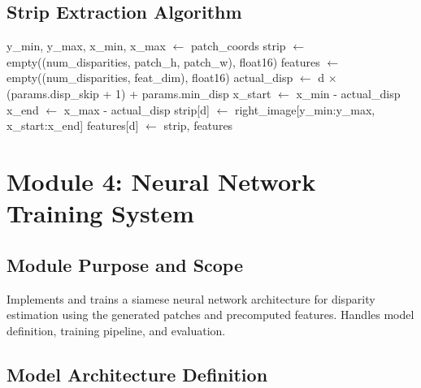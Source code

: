 \documentclass[12pt]{article}
\begin{document}
\subsection{Strip Extraction Algorithm}

\begin{algorithm}[H]
\caption{Right Image Strip Generation}
\begin{algorithmic}[1]
\State y\_min, y\_max, x\_min, x\_max $\gets$ patch\_coords
\State strip $\gets$ empty((num\_disparities, patch\_h, patch\_w), float16)
\State features $\gets$ empty((num\_disparities, feat\_dim), float16)
\State {}
    \State actual\_disp $\gets$ d $\times$ (params.disp\_skip + 1) + params.min\_disp
    \State x\_start $\gets$ x\_min - actual\_disp
    \State x\_end $\gets$ x\_max - actual\_disp
    \State strip[d] $\gets$ right\_image[y\_min:y\_max, x\_start:x\_end]
    \State features[d] $\gets$ 
\EndFor
\State \Return strip, features
\EndFunction
\end{algorithmic}
\end{algorithm}

\section{Module 4: Neural Network Training System}

\subsection{Module Purpose and Scope}
Implements and trains a siamese neural network architecture for disparity estimation using the generated patches and precomputed features. Handles model definition, training pipeline, and evaluation.

\subsection{Model Architecture Definition}
\end{document}
